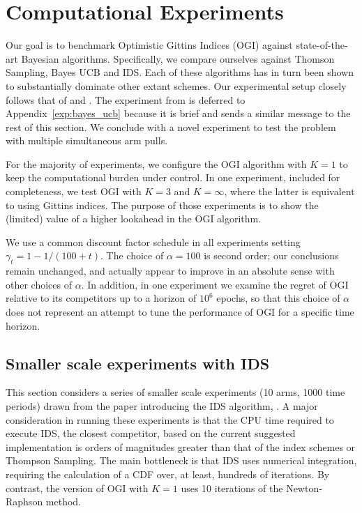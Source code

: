 \section{Computational Experiments} \label{sec:experiments}
Our goal is to benchmark Optimistic Gittins Indices (OGI) against state-of-the-art Bayesian algorithms. Specifically, we compare ourselves against Thomson Sampling, Bayes UCB and IDS. Each of these algorithms has in turn been shown to substantially dominate other extant schemes. Our experimental setup closely follows that of \cite{russo2014learning,kaufmann2012thompson} and \cite{chapelle2011empirical}. 
The experiment from \cite{kaufmann2012thompson} is deferred to Appendix~\ref{exp:bayes_ucb} because it is brief and sends a similar message to the rest of this section. We conclude with a novel experiment to test the problem with multiple simultaneous arm pulls.

For the majority of experiments, we configure the OGI algorithm with $K =1$ to keep the computational burden under control. In one experiment, included for completeness, we test OGI with $K = 3$ and $K=\infty$, where the latter is equivalent to using Gittins indices. The purpose of those experiments is to show the (limited) value of a higher lookahead in the OGI algorithm. 

We use a common discount factor schedule in all experiments setting $\gamma_t = 1 - 1/(100 + t)$. The choice of $\alpha = 100$ is second order; our conclusions remain unchanged, and actually appear to improve in an absolute sense with other choices of $\alpha$. In addition, in one experiment we examine the regret of OGI relative to its competitors up to a horizon of $10^6$ epochs, so that this choice of $\alpha$ does not represent an attempt to tune the performance of OGI for a specific time horizon. 



\subsection{Smaller scale experiments with IDS}

This section considers a series of smaller scale experiments (10 arms, 1000 time periods) drawn from the paper introducing the IDS algorithm, \citep{russo2014learning}. A major consideration in running these experiments is that the CPU time required to execute IDS, the closest competitor, based on the current suggested implementation is orders of magnitudes greater than that of the index schemes or Thompson Sampling. The main bottleneck is that IDS uses numerical integration, requiring the calculation of a CDF over, at least, hundreds of iterations. By contrast, the version of OGI with $K=1$ uses 10 iterations of the Newton-Raphson method. 

